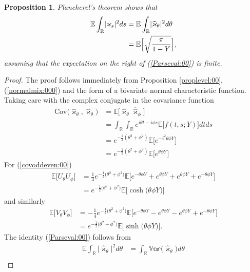 \documentclass[preprint,11pt]{elsarticle}
\newtheorem{Proposition}{Proposition}
\theoremstyle{remark}
\begin{document}
{\begin{Proposition}
Plancherel's theorem shows that
\begin{align}
\mathbb{E}\int_{\mathbb{R}} \lvert\varkappa_s\rvert^2ds &= 
\mathbb{E}\int_{\mathbb{R}} \lvert\widehat{\varkappa}_\theta\rvert^2d\theta\nonumber \\
& = \mathbb{E}\Bigl [\sqrt { \frac{\pi}{1-Y} }\Bigr ],
\label{Parseval:00}
\end{align}
assuming that the expectation on the right of (\ref{Parseval:00}) is finite.
\end{Proposition}
\begin{proof}
The proof follows immediately from Proposition \ref{proplevel:00}, (\ref{normalmix:000}) and the form of a bivariate normal characteristic function.
Taking care with the complex conjugate in the covariance function 
\begin{align*}
\text{Cov}\big (\hat{\varkappa}_\theta,\hat{\varkappa}_\theta\big )
&= \mathbb{E}\big [\hat{\varkappa}_\theta\overline{\hat{\varkappa}}_\phi\big ]\\
&= \int_{\mathbb{R}}\int_{\mathbb{R}}
e^{i\theta t - i\phi s}\mathbb{E}\big [f(t,s;Y)\big ]dtds\\
&= e^{-\frac{1}{2}(\theta^2+\phi^2)}\mathbb{E}\big [e^{-i^2\theta\phi Y}\big ]\\
&= e^{-\frac{1}{2}(\theta^2+\phi^2)}\mathbb{E}\big [e^{\theta\phi Y}]
\end{align*}
For (\ref{covoddeven:00})
\begin{align*}
\mathbb{E}\big [
U_\theta U_\phi\big ]
&= \frac{1}{4}e^{-\frac{1}{2}\big (\theta^2+\phi^2\big )}\mathbb{E}\big [e^{-\theta\phi Y} + e^{\theta\phi Y} + e^{\theta\phi Y} + e^{-\theta\phi Y}\big ]\\
&=  e^{-\frac{1}{2}\big (\theta^2+\phi^2\big )}
 \mathbb{E}\big [\cosh\big (\theta\phi Y\big )\big ]
 \end{align*}
 and similarly
\begin{align*}
\mathbb{E}\big [
V_\theta V_\phi \big ] &= 
-\frac{1}{4}e^{-\frac{1}{2}\big (\theta^2+\phi^2\big )}
\mathbb{E}\big [e^{-\theta\phi Y} - e^{\theta\phi Y} - e^{\theta\phi Y} + e^{-\theta\phi Y}\big ]\\
&=e^{-\frac{1}{2}\big (\theta^2+\phi^2\big )}
\mathbb{E}\big [ \sinh\big (\theta\phi Y\big )\big ].
\end{align*}
The identity (\ref{Parseval:00}) follows from 
\begin{align*}
\mathbb{E}\int_{\mathbb{R}} \lvert\widehat{\varkappa}_\theta\rvert^2d\theta
&= \mathbb{\int_{\mathbb{R}} \text{Var}(\widehat{\varkappa}_\theta})d\theta\nonumber\\ 

\end{align*}
\end{proof}}
\end{document}
